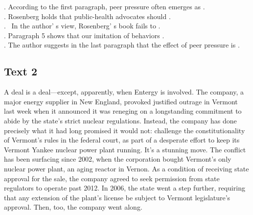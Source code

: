 \begin{questions} . According to the first paragraph, peer pressure often emerges as       .
   \\ . Rosenberg holds that public-health advocates should        .
   \\ .  In the author’ s view, Rosenberg’ s book fails to         .
   \\ . Paragraph 5 shows that our imitation of behaviors         .
   \\ . The author suggests in the last paragraph that the effect of peer pressure is         .
   \\ \end{questions}      \subsection{Text 2}
    A deal is a deal—except, apparently, when Entergy is involved. The company, a major energy supplier in New England, provoked justified outrage in Vermont last week when it announced it was reneging on a longstanding commitment to abide by the state’s strict nuclear regulations.
Instead, the company has done precisely what it had long promised it would not: challenge the constitutionality of Vermont’s rules in the federal court, as part of a desperate effort to keep its Vermont Yankee nuclear power plant running. It’s a stunning move.
The conflict has been surfacing since 2002, when the corporation bought Vermont’s only nuclear power plant, an aging reactor in Vernon. As a condition of receiving state approval for the sale, the company agreed to seek permission from state regulators to operate past 2012. In 2006, the state went a step further, requiring that any extension of the plant’s license be subject to Vermont legislature’s approval. Then, too, the company went along.
